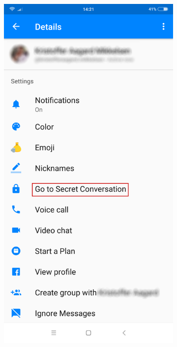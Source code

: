 \begin{figure}[H]
\begin{subfigure}{0.33\textwidth}
        \caption{}
        \label{fig:}
    \end{subfigure}
    \begin{subfigure}{0.33\textwidth}
        \centering
        \includegraphics[scale=0.15]{Projectdoc/Problemanalyse/Illustrationer/3-fbchat.png} 

\end{subfigure}
\end{figure}
